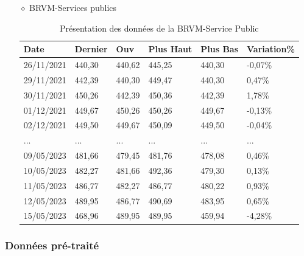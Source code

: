 \begin{itemize}
\item[$\diamond$] BRVM-Services publics
\begin{table}[ht]
	\centering
	\caption{Présentation des données de la BRVM-Service Public}\label{tab:multirow}
	\begin{tabular}{p{2cm}p{2cm}p{2cm}p{2cm}p{2cm}p{2cm}}
		\hline
		Date 		& Dernier 	& Ouv 		& Plus Haut & Plus Bas 	& Variation\%	\\
		\hline                                                                        
		26/11/2021  &440,30  &440,62     &445,25   &440,30      &-0,07\% \\ 
		29/11/2021  &442,39  &440,30     &449,47   &440,30      &0,47\%    \\ 
		30/11/2021  &450,26  &442,39     &450,36   &442,39      &1,78\%  \\   
		01/12/2021  &449,67  &450,26     &450,26   &449,67      &-0,13\%  \\   
		02/12/2021  &449,50  &449,67     &450,09   &449,50      &-0,04\%  \\   
		...           & ...     &...       & ...     & ...       &  ...     \\   
		09/05/2023  &481,66  &479,45     &481,76   &478,08       &0,46\%  \\   
		10/05/2023  &482,27  &481,66     &492,36   &479,30       &0,13\%  \\   
		11/05/2023  &486,77  &482,27     &486,77   &480,22       &0,93\%  \\   
		12/05/2023  &489,95  &486,77     &490,69   &483,95       &0,65\%  \\   
		15/05/2023  &468,96  &489,95     &489,95   &459,94      &-4,28\%  \\   
		\hline
	\end{tabular}
\end{table}%
\end{itemize}

\newpage

\subsubsection{Données pré-traité}

